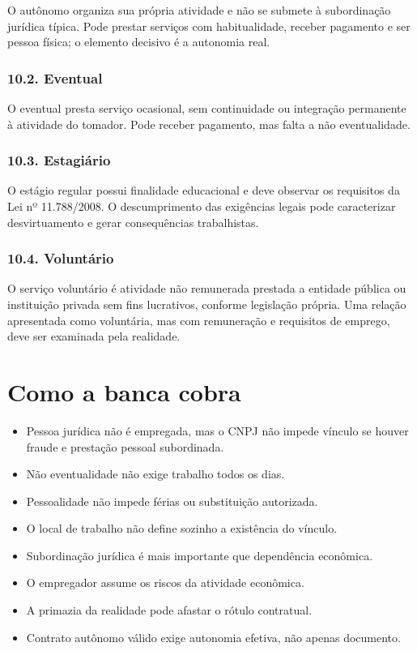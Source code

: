 \documentclass[11pt,a4paper]{article}
\begin{document}
O autônomo organiza sua própria atividade e não se submete à subordinação jurídica típica. Pode prestar serviços com habitualidade, receber pagamento e ser pessoa física; o elemento decisivo é a autonomia real.

\subsubsection*{10.2. Eventual}

O eventual presta serviço ocasional, sem continuidade ou integração permanente à atividade do tomador. Pode receber pagamento, mas falta a não eventualidade.

\subsubsection*{10.3. Estagiário}

O estágio regular possui finalidade educacional e deve observar os requisitos da Lei nº 11.788/2008. O descumprimento das exigências legais pode caracterizar desvirtuamento e gerar consequências trabalhistas.

\subsubsection*{10.4. Voluntário}

O serviço voluntário é atividade não remunerada prestada a entidade pública ou instituição privada sem fins lucrativos, conforme legislação própria. Uma relação apresentada como voluntária, mas com remuneração e requisitos de emprego, deve ser examinada pela realidade.

\section*{Como a banca cobra}

\begin{itemize}
  \item Pessoa jurídica não é empregada, mas o CNPJ não impede vínculo se houver fraude e prestação pessoal subordinada.
  \item Não eventualidade não exige trabalho todos os dias.
  \item Pessoalidade não impede férias ou substituição autorizada.
  \item O local de trabalho não define sozinho a existência do vínculo.
  \item Subordinação jurídica é mais importante que dependência econômica.
  \item O empregador assume os riscos da atividade econômica.
  \item A primazia da realidade pode afastar o rótulo contratual.
  \item Contrato autônomo válido exige autonomia efetiva, não apenas documento.
\end{itemize}
\end{document}
